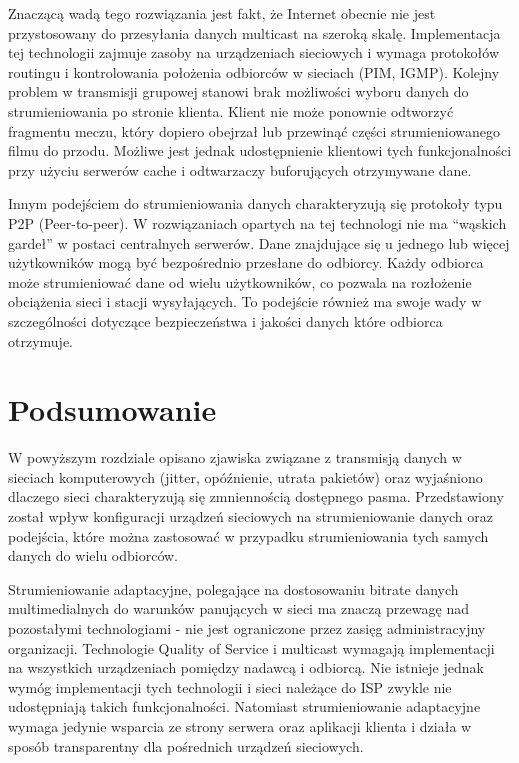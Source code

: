 Znaczącą wadą tego rozwiązania jest fakt, że Internet obecnie nie jest przystosowany do przesyłania danych multicast na szeroką skalę. Implementacja tej technologii zajmuje zasoby na urządzeniach sieciowych i wymaga protokołów routingu i kontrolowania położenia odbiorców w sieciach (PIM, IGMP). Kolejny problem w transmisji grupowej stanowi brak możliwości wyboru danych do strumieniowania po stronie klienta. Klient nie może ponownie odtworzyć fragmentu meczu, który dopiero obejrzał lub przewinąć części strumieniowanego filmu do przodu. Możliwe jest jednak udostępnienie klientowi tych funkcjonalności przy użyciu serwerów cache i odtwarzaczy buforujących otrzymywane dane.

Innym podejściem do strumieniowania danych charakteryzują się protokoły typu P2P (Peer-to-peer). W rozwiązaniach opartych na tej technologi nie ma ``wąskich gardeł'' w postaci centralnych serwerów. Dane znajdujące się u jednego lub więcej użytkowników mogą być bezpośrednio przesłane do odbiorcy. Każdy odbiorca może strumieniować dane od wielu użytkowników, co pozwala na rozłożenie obciążenia sieci i stacji wysyłających. To podejście również ma swoje wady w szczególności dotyczące bezpieczeństwa i jakości danych które odbiorca otrzymuje. 

\section{Podsumowanie}

W powyższym rozdziale opisano zjawiska związane z transmisją danych w sieciach komputerowych (jitter, opóźnienie, utrata pakietów) oraz wyjaśniono dlaczego sieci charakteryzują się zmniennością dostępnego pasma. Przedstawiony został wpływ konfiguracji urządzeń sieciowych na strumieniowanie danych oraz podejścia, które można zastosować w przypadku strumieniowania tych samych danych do wielu odbiorców.

Strumieniowanie adaptacyjne, polegające na dostosowaniu bitrate danych multimedialnych do warunków panujących w sieci ma znaczą przewagę nad pozostałymi technologiami - nie jest ograniczone przez zasięg administracyjny organizacji. Technologie Quality of Service i multicast wymagają implementacji na wszystkich urządzeniach pomiędzy nadawcą i odbiorcą. Nie istnieje jednak wymóg implementacji tych technologii i sieci należące do ISP zwykle nie udostępniają takich funkcjonalności. Natomiast strumieniowanie adaptacyjne wymaga jedynie wsparcia ze strony serwera oraz aplikacji klienta i działa w sposób transparentny dla pośrednich urządzeń sieciowych.